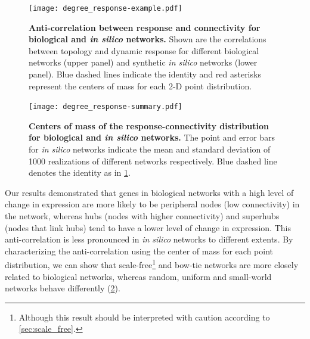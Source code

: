 \begin{figure}[!ht]
\begin{center}
\texttt{[image: degree\_response-example.pdf]}
\end{center}
\caption[Anti-correlation between response and connectivity]{
{\bf Anti-correlation between response and connectivity for biological and 
\emph{in silico} networks.} 
Shown are the correlations between topology and dynamic response for different
biological networks (upper panel) and synthetic \emph{in silico} networks
(lower panel). Blue dashed lines indicate the identity and red asterisks 
represent the centers of mass for each 2-D point distribution.
}
\label{fig:degree_response_example}
\end{figure}

\begin{figure}[!ht]
\begin{center}
\texttt{[image: degree\_response-summary.pdf]}
\end{center}
\caption[Comparison between biological and \emph{in silico} networks]{
{\bf Centers of mass of the response-connectivity distribution for biological
and \emph{in silico} networks.} 
The point and error bars for \emph{in silico} networks indicate the mean
and standard deviation of 1000 realizations of different networks respectively.
Blue dashed line denotes the identity as in \ref{fig:degree_response_example}.
}
\label{fig:degree_response_summary}
\end{figure}

Our results demonstrated that genes in biological networks with a high level 
of change in expression are more likely to be peripheral nodes 
(low connectivity) in the network, whereas hubs (nodes with higher 
connectivity) and superhubs (nodes that link hubs) tend to have a lower level 
of change in expression. This anti-correlation is less pronounced in 
\emph{in silico} networks to different extents. By characterizing the 
anti-correlation using the center of mass for each point distribution, we
can show that scale-free\footnote{Although this result should be interpreted 
with caution according to \ref{sec:scale_free}.} and bow-tie networks are more closely related to
biological networks, whereas random, uniform and small-world networks behave
differently (\ref{fig:degree_response_summary}).

